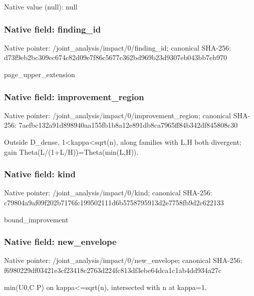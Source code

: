 \documentclass[10pt,a4paper]{article}
\begin{document}
Native value (null): null

\subsubsection{Native field: finding\_\allowbreak{}id}
Native pointer: /joint\_\allowbreak{}analysis/impact/0/finding\_\allowbreak{}id; canonical SHA-256: d73f9eb2bc309ec674c82d09e7f86c5677c362bd969b23d9307eb043bb7eb970

\begingroup\raggedright\sloppy page\_\allowbreak{}upper\_\allowbreak{}extension\par\endgroup

\subsubsection{Native field: improvement\_\allowbreak{}region}
Native pointer: /joint\_\allowbreak{}analysis/impact/0/improvement\_\allowbreak{}region; canonical SHA-256: 7aefbc132a91d898940aa155fb1b8a12e891db8ca7965ff84b342df845808c30

\begingroup\raggedright\sloppy Outside D\_\allowbreak{}dense,\allowbreak{} 1<kappa<sqrt(n),\allowbreak{} along families with L,\allowbreak{}H both divergent;\allowbreak{} gain Theta(L/\allowbreak{}(1+L/\allowbreak{}H))=\allowbreak{}Theta(min(L,\allowbreak{}H)).\par\endgroup

\subsubsection{Native field: kind}
Native pointer: /joint\_\allowbreak{}analysis/impact/0/kind; canonical SHA-256: c79804a9af09f202b7176fc199502111d6b5758795913d2e7758fb9d2c622133

\begingroup\raggedright\sloppy bound\_\allowbreak{}improvement\par\endgroup

\subsubsection{Native field: new\_\allowbreak{}envelope}
Native pointer: /joint\_\allowbreak{}analysis/impact/0/new\_\allowbreak{}envelope; canonical SHA-256: f6980229df03421e3cf23418c2763d224fc813df3ebe64dca1c1ab4dd934a27c

\begingroup\raggedright\sloppy min(U0,\allowbreak{}C P) on kappa<=\allowbreak{}sqrt(n),\allowbreak{} intersected with n at kappa=\allowbreak{}1.\par\endgroup
\end{document}
